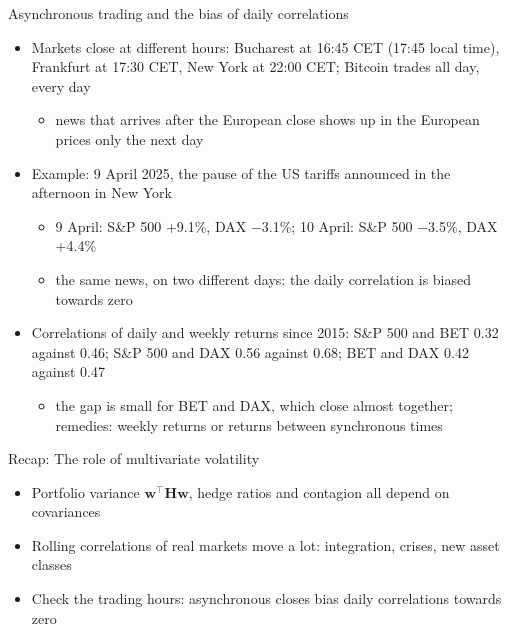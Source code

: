 \begin{frame}{Asynchronous trading and the bias of daily correlations}
\itemsize{\footnotesize}
\begin{itemize}
    \item Markets close at different hours: Bucharest at 16:45 CET (17:45 local time), Frankfurt at 17:30 CET, New York at 22:00 CET; Bitcoin trades all day, every day
    \begin{itemize}
        \item news that arrives after the European close shows up in the European prices only the next day
    \end{itemize}
    \item Example: 9 April 2025, the pause of the US tariffs announced in the afternoon in New York
    \begin{itemize}
        \item 9 April: S\&P 500 +9.1\%, DAX $-$3.1\%; 10 April: S\&P 500 $-$3.5\%, DAX +4.4\%
        \item the same news, on two different days: the daily correlation is biased towards zero
    \end{itemize}
    \item Correlations of daily and weekly returns since 2015: S\&P 500 and BET 0.32 against 0.46; S\&P 500 and DAX 0.56 against 0.68; BET and DAX 0.42 against 0.47
    \begin{itemize}
        \item the gap is small for BET and DAX, which close almost together; remedies: weekly returns or returns between synchronous times
    \end{itemize}
\end{itemize}
\end{frame}

\begin{frame}{Recap: The role of multivariate volatility}
\itemsize{\small}
\begin{itemize}
    \item Portfolio variance $\mathbf{w}^\top\mathbf{H}\mathbf{w}$, hedge ratios and contagion all depend on covariances
    \item Rolling correlations of real markets move a lot: integration, crises, new asset classes
    \item Check the trading hours: asynchronous closes bias daily correlations towards zero
\end{itemize}
\end{frame}


